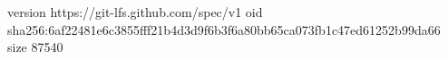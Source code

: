 version https://git-lfs.github.com/spec/v1
oid sha256:6af22481e6c3855fff21b4d3d9f6b3f6a80bb65ca073fb1c47ed61252b99da66
size 87540
